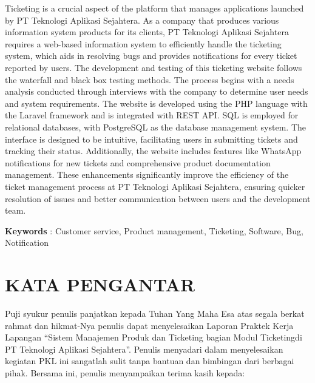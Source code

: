 \documentclass[12pt]{article}
\begin{document}
\noindent Ticketing is a crucial aspect of the platform that manages applications launched by PT Teknologi Aplikasi Sejahtera. As a company that produces various information system products for its clients, PT Teknologi Aplikasi Sejahtera requires a web-based information system to efficiently handle the ticketing system, which aids in resolving bugs and provides notifications for every ticket reported by users. The development and testing of this ticketing website follows the waterfall and black box testing methods. The process begins with a needs analysis conducted through interviews with the company to determine user needs and system requirements. The website is developed using the PHP language with the Laravel framework and is integrated with REST API. SQL is employed for relational databases, with PostgreSQL as the database management system. The interface is designed to be intuitive, facilitating users in submitting tickets and tracking their status. Additionally, the website includes features like WhatsApp notifications for new tickets and comprehensive product documentation management. These enhancements significantly improve the efficiency of the ticket management process at PT Teknologi Aplikasi Sejahtera, ensuring quicker resolution of issues and better communication between users and the development team.

\vspace*{1cm}
\noindent \textbf{Keywords} : Customer service, Product management, Ticketing, Software, Bug, Notification


\newpage

\section*{KATA PENGANTAR}


Puji syukur penulis panjatkan kepada Tuhan Yang Maha Esa atas segala berkat rahmat dan hikmat-Nya penulis dapat menyelesaikan Laporan Praktek Kerja Lapangan “Sistem Manajemen Produk dan Ticketing bagian Modul Ticketingdi PT Teknologi Aplikasi Sejahtera”. Penulis menyadari dalam menyelesaikan kegiatan PKL ini sangatlah sulit tanpa bantuan dan bimbingan dari berbagai  pihak. Bersama ini, penulis menyampaikan terima kasih kepada:
\end{document}

